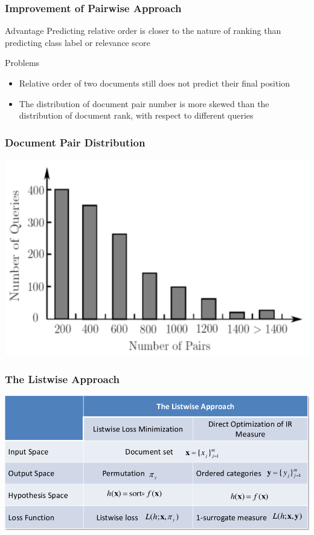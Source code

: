 \documentclass{beamer}
\begin{document}

\begin{frame}
    \frametitle{Improvement of Pairwise Approach}
    \begin{block}{Advantage}
        Predicting relative order is closer to the nature of ranking than
        predicting class label or relevance score
    \end{block}
    \begin{block}{Problems}
        \begin{itemize}
        \item Relative order of two documents still does not predict their
            final position
        \item The distribution of document pair number is more skewed than the
            distribution of document rank, with respect to different queries
        \end{itemize}
    \end{block}
\end{frame}

\begin{frame}
    \frametitle{Document Pair Distribution}
    \centering
    \includegraphics[width=\linewidth]{pair_distribution}
\end{frame}

\begin{frame}
    \frametitle{The Listwise Approach}
    \centering
    \includegraphics[width=\linewidth]{listwise}
\end{frame}
\end{document}
